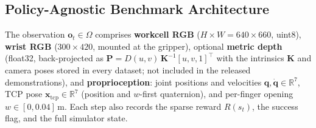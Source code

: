 \documentclass[conference]{IEEEtran}
\begin{document}
\subsection{Policy-Agnostic Benchmark Architecture}
The observation $\mathbf{o}_t \in \Omega$ comprises \textbf{workcell RGB} ($H \times W = 640 \times 660$, uint8), \textbf{wrist RGB} ($300 \times 420$, mounted at the gripper), optional \textbf{metric depth} (float32, back-projected as $\mathbf{P} = D(u,v)\,\mathbf{K}^{-1} [u, v, 1]^\top$ with the intrinsics $\mathbf{K}$ and camera poses stored in every dataset; not included in the released demonstrations), and \textbf{proprioception}: joint positions and velocities $\mathbf{q}, \dot{\mathbf{q}} \in \mathbb{R}^7$, TCP pose $\mathbf{x}_{\text{tcp}} \in \mathbb{R}^7$ (position and $w$-first quaternion), and per-finger opening $w \in [0, 0.04]$\,m. Each step also records the sparse reward $R(s_t)$, the success flag, and the full simulator state.
\end{document}
